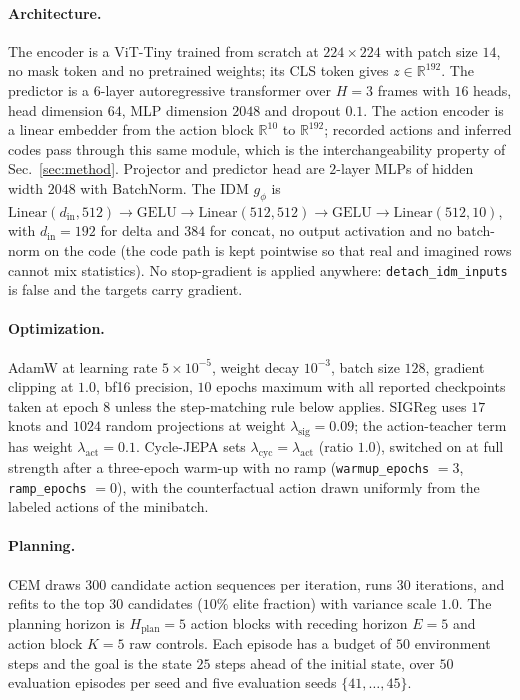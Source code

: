 \documentclass{article}
\begin{document}
\paragraph{Architecture.}
The encoder is a ViT-Tiny \citep{assran2023ijepa} trained from scratch at
$224 \times 224$ with patch size $14$, no mask token and no pretrained weights;
its CLS token gives $z \in \mathbb{R}^{192}$. The predictor is a $6$-layer
autoregressive transformer over $H = 3$ frames with $16$ heads, head dimension
$64$, MLP dimension $2048$ and dropout $0.1$. The action encoder is a linear
embedder from the action block $\mathbb{R}^{10}$ to $\mathbb{R}^{192}$; recorded
actions and inferred codes pass through this same module, which is the
interchangeability property of Sec.~\ref{sec:method}. Projector and predictor
head are $2$-layer MLPs of hidden width $2048$ with BatchNorm. The IDM $g_\phi$
is $\mathrm{Linear}(d_{\mathrm{in}}, 512) \to \mathrm{GELU} \to
\mathrm{Linear}(512, 512) \to \mathrm{GELU} \to \mathrm{Linear}(512, 10)$, with
$d_{\mathrm{in}} = 192$ for delta and $384$ for concat, no output activation and
no batch-norm on the code (the code path is kept pointwise so that real and
imagined rows cannot mix statistics). No stop-gradient is applied anywhere:
\texttt{detach\_idm\_inputs} is false and the targets carry gradient.

\paragraph{Optimization.}
AdamW at learning rate $5 \times 10^{-5}$, weight decay $10^{-3}$, batch size
$128$, gradient clipping at $1.0$, bf16 precision, $10$ epochs maximum with all
reported checkpoints taken at epoch $8$ unless the step-matching rule below
applies. SIGReg uses $17$ knots and $1024$ random projections at weight
$\lambda_{\mathrm{sig}} = 0.09$; the action-teacher term has weight
$\lambda_{\mathrm{act}} = 0.1$. Cycle-JEPA sets
$\lambda_{\mathrm{cyc}} = \lambda_{\mathrm{act}}$ (ratio $1.0$), switched on at
full strength after a three-epoch warm-up with no ramp
(\texttt{warmup\_epochs} $= 3$, \texttt{ramp\_epochs} $= 0$), with the
counterfactual action drawn uniformly from the labeled actions of the minibatch.

\paragraph{Planning.}
CEM draws $300$ candidate action sequences per iteration, runs $30$ iterations,
and refits to the top $30$ candidates ($10\%$ elite fraction) with variance
scale $1.0$. The planning horizon is $H_{\mathrm{plan}} = 5$ action blocks with
receding horizon $E = 5$ and action block $K = 5$ raw controls. Each episode has
a budget of $50$ environment steps and the goal is the state $25$ steps ahead of
the initial state, over $50$ evaluation episodes per seed and five evaluation
seeds $\{41, \dots, 45\}$.
\end{document}
